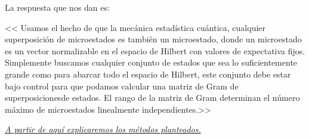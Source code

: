 \documentclass[letterpaper]{article}
\begin{document}
\newpage

\begin{justify} 
La respuesta que nos dan es:
\end{justify}
\begin{justify}
<< Usamos el hecho de que  la mecánica estadística cuántica, cualquier superposición de microestados es también un microestado, donde un microestado
es un vector normalizable en el espacio de Hilbert con valores de expectativa fijos. Simplemente buscamos cualquier conjunto
de estados que sea lo suficientemente grande como para abarcar todo el espacio de Hilbert, este conjunto debe estar bajo control
para que podamos calcular una matriz de Gram de superposicionesde estados. El rango de la matriz de Gram determinan el número máximo
de microestados linealmente independientes.>>
\end{justify}

\vspace{\baselineskip}

\textit{\uline{A partir de aquí explicaremos los métodos planteados.}}
\end{document}
